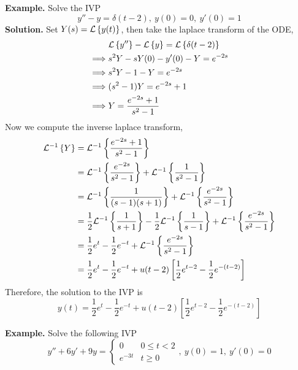 \documentclass[openany]{report}
\begin{document}
\noindent
\textbf{Example.} Solve the IVP 
\[y'' - y = \delta(t-2), \ y(0) = 0, \ y'(0) = 1\]
\noindent
\textbf{Solution.} Set $Y(s) = \mathcal{L}\left\{y(t)\right\}$, then take the laplace transform of the ODE, 
\begin{align*}
    &\mathcal{L}\left\{y''\right\} - \mathcal{L}\left\{y\right\} = \mathcal{L}\left\{\delta(t-2)\right\}\\
    \implies& s^2Y - sY(0) - y'(0) - Y = e^{-2s}\\
    \implies& s^2Y - 1 - Y = e^{-2s}\\
    \implies& (s^2 - 1)Y = e^{-2s} + 1\\
    \implies& Y = \frac{e^{-2s} + 1}{s^2-1}
\end{align*}
Now we compute the inverse laplace transform, 
\begin{align*}
    \mathcal{L}^{-1}\left\{Y\right\} &= \mathcal{L}^{-1}\left\{\frac{e^{-2s} + 1}{s^2 - 1}\right\}\\
    &= \mathcal{L}^{-1}\left\{\frac{e^{-2s}}{s^2-1}\right\} + \mathcal{L}^{-1}\left\{\frac{1}{s^2-1}\right\}\\
    &= \mathcal{L}^{-1}\left\{\frac{1}{(s-1)(s+1)}\right\} + \mathcal{L}^{-1}\left\{\frac{e^{-2s}}{s^2-1}\right\}\\
    &= \frac{1}{2}\mathcal{L}^{-1}\left\{\frac{1}{s+1}\right\} - \frac{1}{2}\mathcal{L}^{-1}\left\{\frac{1}{s-1}\right\} + \mathcal{L}^{-1}\left\{\frac{e^{-2s}}{s^2-1}\right\}\\
    &= \frac{1}{2}e^t - \frac{1}{2}e^{-t} + \mathcal{L}^{-1}\left\{\frac{e^{-2s}}{s^2-1}\right\}\\
    &= \frac{1}{2}e^{t} - \frac{1}{2}e^{-t} + u(t-2)\left[\frac{1}{2}e^{t-2} - \frac{1}{2}e^{-(t-2)}\right]\\
\end{align*}
Therefore, the solution to the IVP is 
\[y(t) = \frac{1}{2}e^{t} - \frac{1}{2}e^{-t} + u(t-2)\left[\frac{1}{2}e^{t-2} - \frac{1}{2}e^{-(t-2)}\right]\]

\noindent
\textbf{Example.} Solve the following IVP 
\[y'' + 6y' + 9y = \begin{cases}
    0 & 0 \leq t < 2\\
    e^{-3t} & t \geq 0
\end{cases}, \ y(0) = 1, \ y'(0) = 0\]
\end{document}
